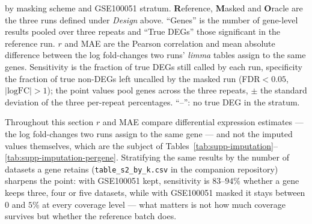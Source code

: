 \documentclass[11pt,a4paper]{article}
\begin{document}
\begin{table}[htbp]
{  by masking scheme and GSE100051 stratum. \textbf{R}eference,
  \textbf{M}asked and \textbf{O}racle are the three runs
  defined under \emph{Design} above. ``Genes'' is
  the number of gene-level results pooled over three repeats and
  ``True DEGs'' those significant in the reference run. $r$ and MAE
  are the Pearson correlation and mean absolute difference
  between the log fold-changes two runs' \textit{limma} tables
  assign to the same genes.
  Sensitivity is the fraction of true DEGs still called by each
  run, specificity the fraction of true non-DEGs left uncalled
  by the masked run (FDR${}<0.05$, $|\text{logFC}|>1$); the
  point values pool genes across the three repeats, $\pm$ the
  standard deviation of the three per-repeat percentages. ``--'':
  no true DEG in the stratum.}
\label{tab:supp-arms}
\end{table}

Throughout this section $r$ and MAE compare differential
expression estimates --- the log fold-changes two runs assign
to the same gene --- and not the imputed values themselves,
which are the subject of
Tables~\ref{tab:supp-imputation}--\ref{tab:supp-imputation-pergene}.
Stratifying the same results by the number of datasets a gene
retains (\texttt{table\_s2\_by\_k.csv} in the companion
repository) sharpens the point: with GSE100051 kept,
sensitivity is $83$--$94\%$ whether a gene keeps three, four
or five datasets, while with GSE100051 masked it stays between
$0$ and $5\%$ at every coverage level --- what matters is not
how much coverage survives but whether the reference batch
does.
\end{document}
